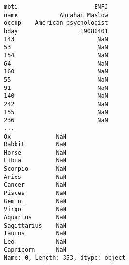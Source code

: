 \documentclass[12pt,fleqn]{article}\usepackage{common}
\begin{document}
\begin{verbatim}
mbti                      ENFJ
name            Abraham Maslow
occup    American psychologist
bday                  19080401
143                        NaN
53                         NaN
154                        NaN
64                         NaN
160                        NaN
55                         NaN
91                         NaN
140                        NaN
242                        NaN
155                        NaN
236                        NaN
...
Ox             NaN
Rabbit         NaN
Horse          NaN
Libra          NaN
Scorpio        NaN
Aries          NaN
Cancer         NaN
Pisces         NaN
Gemini         NaN
Virgo          NaN
Aquarius       NaN
Sagittarius    NaN
Taurus         NaN
Leo            NaN
Capricorn      NaN
Name: 0, Length: 353, dtype: object
\end{verbatim}
\end{document}
